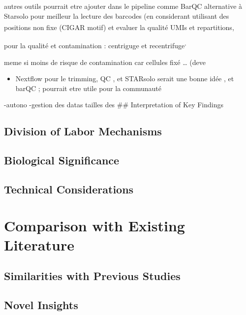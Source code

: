 \documentclass[
  11pt,
  a4paper,
]{report}
\providecommand{\tightlist}{%
  \setlength{\itemsep}{0pt}\setlength{\parskip}{0pt}}\usepackage{longtable,booktabs,array}
\begin{document}
autres outils pourrait etre ajouter dans le pipeline comme BarQC
alternative à Starsolo pour meilleur la lecture des barcodes (en
considerant utilisant des positions non fixe (CIGAR motif) et evaluer la
qualité UMIs et
repartitions\textsuperscript{},

pour la qualité et contamination : centriguge et
recentrifuge\textsuperscript{,}

meme si moins de risque de contamination car cellules fixé \ldots{}
(deve

\begin{itemize}
\tightlist
\item
  Nextflow pour le trimming, QC , et STARsolo serait une bonne idée , et
  barQC ; pourrait etre utile pour la communauté
\end{itemize}

-autono -gestion des datas tailles des \#\# Interpretation of Key
Findings

\subsection{Division of Labor
Mechanisms}\label{division-of-labor-mechanisms}

\subsection{Biological Significance}\label{biological-significance}

\subsection{Technical Considerations}\label{technical-considerations}

\section{Comparison with Existing
Literature}\label{comparison-with-existing-literature}

\subsection{Similarities with Previous
Studies}\label{similarities-with-previous-studies}

\subsection{Novel Insights}\label{novel-insights}
\end{document}
